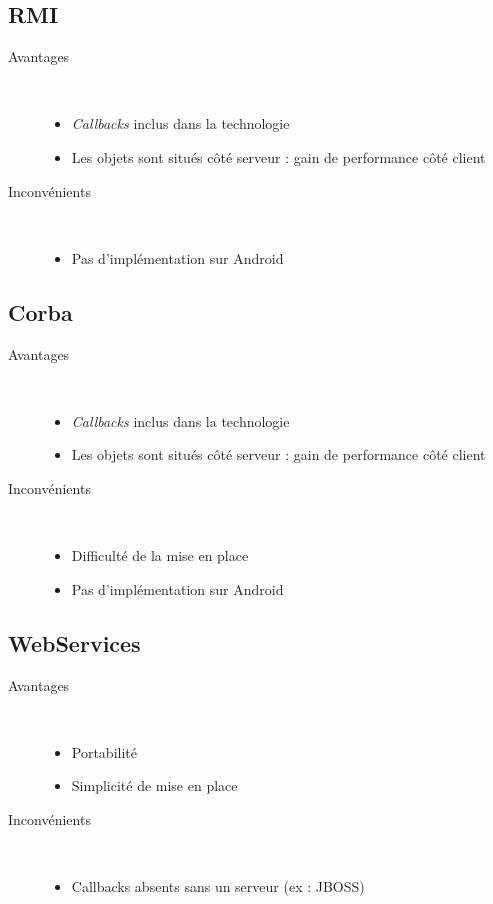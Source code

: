 \subsection{RMI}
\begin{description}
	\item[Avantages]~
	\begin{itemize}
		\item \emph{Callbacks} inclus dans la technologie
		\item Les objets sont situés côté serveur : gain de performance côté client
	\end{itemize}
	\item[Inconvénients]~
	\begin{itemize}
		\item Pas d'implémentation sur Android
	\end{itemize}
\end{description}

\subsection{Corba}
\begin{description}
	\item[Avantages]~
	\begin{itemize}
		\item \emph{Callbacks} inclus dans la technologie
		\item Les objets sont situés côté serveur : gain de performance côté client
	\end{itemize}
	\item[Inconvénients]~
	\begin{itemize}
		\item Difficulté de la mise en place
		\item Pas d'implémentation sur Android
	\end{itemize}
\end{description}

\subsection{WebServices}
\begin{description}
	\item[Avantages]~
	\begin{itemize}
		\item Portabilité
		\item Simplicité de mise en place
	\end{itemize}
	\item[Inconvénients]~
	\begin{itemize}
		\item Callbacks absents sans un serveur (ex : JBOSS)
	\end{itemize}
\end{description}

